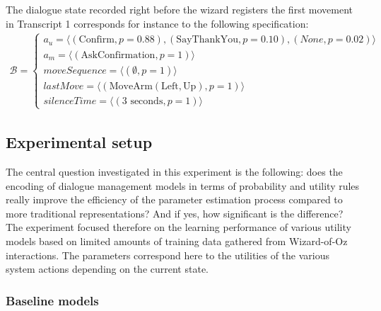 The dialogue state recorded right before the wizard registers the first movement in Transcript 1 corresponds for instance to the following specification: 
\begin{align*}
\mathcal{B} = \begin{cases} a_u = \langle (\mathrm{Confirm}, p\!=\!0.88), (\mathrm{SayThankYou}, p\!=\!0.10), (\mathit{None}, p\!=\!0.02) \rangle \\
a_m = \langle (\mathrm{AskConfirmation}, p\!=\!1) \rangle \\
\mathit{moveSequence} = \langle ( \emptyset, p\!=\!1) \rangle \\
\mathit{lastMove} = \langle (\mathrm{MoveArm(Left,Up)}, p\!=\!1) \rangle \\
\mathit{silenceTime} = \langle (3 \textrm{ seconds}, p\!=\!1) \rangle \end{cases}
\end{align*}

\subsection{Experimental setup}
\label{sec:wozlearning-experiments-setup}

The central question investigated in this experiment is the following: does the encoding of dialogue management models in terms of probability and utility rules really improve the efficiency of the parameter estimation process compared to more traditional representations? And if yes, how significant is the difference? The experiment focused therefore on the learning performance of various utility models based on limited amounts of training data gathered from Wizard-of-Oz interactions. The parameters correspond here to the utilities of the various system actions depending on the current state.

\subsubsection*{Baseline models}

